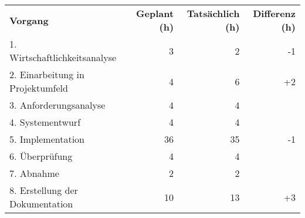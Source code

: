 \begin{tabularx}{\textwidth}{Xrrr}
    \rowcolor{KVGruen}\textbf{Vorgang} & \textbf{Geplant (h)} & \textbf{Tatsächlich (h)} & \textbf{Differenz (h)} \\
    1. Wirtschaftlichkeitsanalyse & 3 & 2 & -1 \\
    \rowcolor{KVGrau}2. Einarbeitung in Projektumfeld & 4   & 6   & +2 \\
    3. Anforderungsanalyse & 4 & 4 & \\
    \rowcolor{KVGrau}4. Systementwurf & 4   & 4   &  \\
    5. Implementation & 36 & 35 & -1 \\
    \rowcolor{KVGrau}6. Überprüfung & 4   & 4  &  \\
    7. Abnahme & 2 & 2 &  \\
    \rowcolor{KVGrau}8. Erstellung der Dokumentation & 10  & 13  & +3 \\
\end{tabularx}
